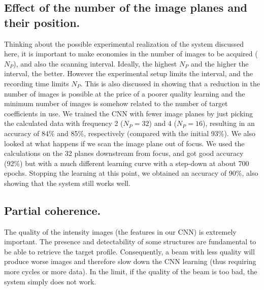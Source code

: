 \documentclass[preprint]{iucr}
\newcommand{\inred}[1]{{\color{red}#1}}
\begin{document}
\subsection{Effect of the number of the image planes and their position.}
Thinking about the possible experimental realization of the system discussed here, it is important to make economies in the number of images to be acquired ($N_P$), and also the scanning interval. Ideally, the highest $N_P$ and the higher the interval, the better. However the experimental setup limits the interval, and the recording time limits $N_P$. This is also discussed in \cite{Saha2020} showing that a reduction in the number of images is possible at the price of a \inred{poorer quality} learning and the minimum number of images is somehow related to the number of target coefficients in use. We trained the CNN with fewer image planes by just picking the calculated data with frequency 2 ($N_P=32$) and 4 ($N_P=16$), resulting in an accuracy of 84\% and 85\%, respectively (compared with the initial 93\%). 
We also looked at what happens if we scan the image plane out of focus. We used the calculations on the 32 planes downstream from focus, and got good accuracy (92\%) but with a much different learning curve with a step-down at about 700 epochs. Stopping the learning at this point, we obtained an accuracy of 90\%, also showing that the system still works well. 

\subsection{Partial coherence.}
The quality of the intensity images (the features in our CNN) is extremely important. The presence and detectability of some structures are fundamental to be able to retrieve the target profile. Consequently, a beam with less quality will produce worse images and therefore slow down the CNN learning (thus requiring more cycles or more data). In the limit, if the quality of the beam is too bad, the system simply does not work.  
\end{document}
